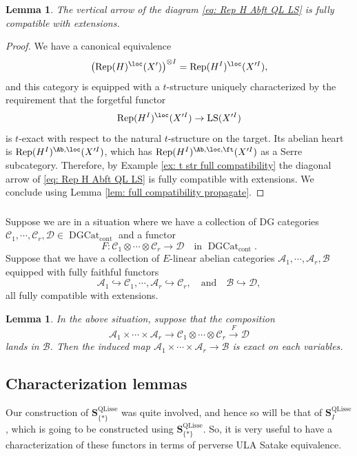 \documentclass[10pt]{amsart}
\newcommand{\sssec}{\subsubsection}
\newtheorem{lemma}[subsubsection]{Lemma}
\theoremstyle{remark}
\newcommand{\te}{\text}
\newcommand{\on}{\operatorname}
\newcommand{\cA}{\mathcal{A}}
\newcommand{\cB}{\mathcal{B}}
\newcommand{\cC}{\mathcal{C}}
\newcommand{\cD}{\mathcal{D}}
\newcommand{\DGcat}{\on{DGCat}_{\on{cont}}}
\newcommand{\Rep}{\on{Rep}}
\newcommand{\LS}{\on{LS}}
\newcommand{\QLisse}{\on{QLisse}}
\begin{document}
\begin{lemma}\label{lem: Rep H Abft QL full compatibility}
    The vertical arrow of the diagram \eqref{eq: Rep H Abft QL LS} is fully compatible with extensions.
\end{lemma}
\begin{proof}
    We have a canonical equivalence
\[\left(\Rep(H)^{\loc}(X')\right)^{\otimes I} =\Rep(H^I)^{\loc}(X'^I),\]
and this category is equipped with a $t$-structure uniquely characterized by the requirement that the forgetful functor
\[\Rep(H^I)^{\loc}(X'^I)\rightarrow \LS(X'^I)\]
is $t$-exact with respect to the natural $t$-structure on the target. Its abelian heart is $\Rep(H^I)^{\Ab,\loc}(X'^I)$, which has $\Rep(H^I)^{\Ab,\loc,\ft}(X'^I)$ as a Serre subcategory. Therefore, by Example \ref{ex: t str full compatibility} the diagonal arrow of \eqref{eq: Rep H Abft QL LS} is fully compatible with extensions. We conclude using Lemma \ref{lem: full compatibility propagate}.
\end{proof}

\sssec{}
Suppose we are in a situation where we have a collection of DG categories $\cC_1,\cdots,\cC_r, \cD\in\DGcat$ and a functor
\[F: \cC_1\otimes\cdots\otimes \cC_r\rightarrow \cD \quad \te{in }\DGcat.\]
Suppose that we have a collection of $E$-linear abelian categories $\cA_1,\cdots,\cA_r,\cB$ equipped with fully faithful functors
\[\cA_1\hookrightarrow \cC_1,\cdots, \cA_r\hookrightarrow \cC_r,\quad\te{and}\quad \cB\hookrightarrow\cD,\]
all fully compatible with extensions. 

\begin{lemma}\label{lem: induced exactness}
    In the above situation, suppose that the composition
    \[\cA_1\times \cdots\times\cA_r\rightarrow \cC_1\otimes\cdots\otimes\cC_r\xrightarrow{F}\cD\]
    lands in $\cB$. Then the induced map $\cA_1\times\cdots\times\cA_r\rightarrow \cB$
    is exact on each variables.
\end{lemma}

\subsection{Characterization lemmas}\label{ssec: characterization lemmas}
 Our construction of $\mathbf{S}^{\QLisse}_{\{*\}}$ was quite involved, and hence so will be that of $\mathbf{S}^{\QLisse}_{I}$, which is going to be constructed using $\mathbf{S}^{\QLisse}_{\{*\}}$. So, it is very useful to have a characterization of these functors in terms of perverse ULA Satake equivalence. 
\medskip
\end{document}
